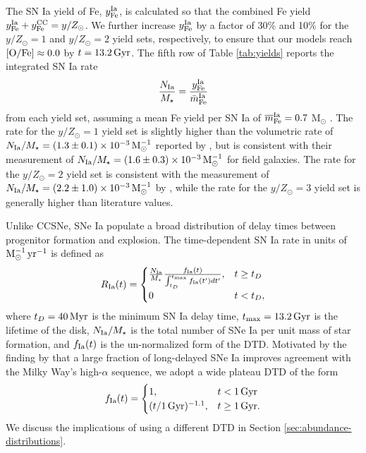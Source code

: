 \documentclass[twocolumn,twocolappendix,linenumbers]{aastex631}
\newcommand{\mathOFe}{{\rm [O/Fe]}}
\newcommand{\yZ}[1]{$y/Z_\odot=#1$}
\begin{document}
The SN Ia yield of Fe, $y_{\rm Fe}^{\rm Ia}$, is calculated so that the combined Fe yield $y_{\rm Fe}^{\rm Ia}+y_{\rm Fe}^{\rm CC}=y/Z_\odot$. We further increase $y_{\rm Fe}^{\rm Ia}$ by a factor of 30\% and 10\% for the \yZ{1} and \yZ{2} yield sets, respectively, to ensure that our models reach $\mathOFe\approx0.0$ by $t=13.2\,{\rm Gyr}$. The fifth row of Table \ref{tab:yields} reports the integrated SN Ia rate 
\begin{equation}
    \frac{N_{\rm Ia}}{M_\star} = \frac{y_{\rm Fe}^{\rm Ia}}{\bar m_{\rm Fe}^{\rm Ia}}
    \label{eq:snia-rate}
\end{equation}
from each yield set, assuming a mean Fe yield per SN Ia of $\overline m_{\rm Fe}^{\rm Ia}=0.7$ M$_\odot$ \citep{mazzali_common_2007,howell_effect_2009}. The rate for the \yZ{1} yield set is slightly higher than the volumetric rate of $N_{\rm Ia}/M_\star=(1.3\pm0.1)\times10^{-3}\,{\rm M}_\odot^{-1}$ reported by \citet{maoz_star_2017}, but is consistent with their measurement of $N_{\rm Ia}/M_\star=(1.6\pm0.3)\times10^{-3}\,{\rm M}_\odot^{-1}$ for field galaxies. The rate for the \yZ{2} yield set is consistent with the measurement of $N_{\rm Ia}/M_\star=(2.2\pm1.0)\times10^{-3}\,{\rm M}_\odot^{-1}$ by \citet{maoz_type-ia_2012}, while the rate for the \yZ{3} yield set is generally higher than literature values.

Unlike CCSNe, SNe Ia populate a broad distribution of delay times between progenitor formation and explosion. The time-dependent SN Ia rate in units of ${\rm M}_\odot^{-1}\,{\rm yr}^{-1}$ is defined as
\begin{equation}
    R_{\rm Ia}(t) = 
    \begin{cases}
        \frac{N_{\rm Ia}}{M_\star}
        \frac{f_{\rm Ia}(t)}{\int_{t_D}^{t_{\rm max}} f_{\rm Ia}(t') dt'}, & t \ge t_D \\
        0 & t < t_D,
    \end{cases}
    \label{eq:dtd-function}
\end{equation}
where $t_D=40\,{\rm Myr}$ is the minimum SN Ia delay time, $t_{\rm max}=13.2\,{\rm Gyr}$ is the lifetime of the disk, $N_{\rm Ia}/M_\star$ is the total number of SNe Ia per unit mass of star formation, and $f_{\rm Ia}(t)$ is the un-normalized form of the DTD. Motivated by the finding by \citet{dubay_galactic_2024} that a large fraction of long-delayed SNe Ia improves agreement with the Milky Way's high-$\alpha$ sequence, we adopt a wide plateau DTD of the form
\begin{equation}
    \label{eq:plateau-dtd}
    f_{\rm Ia}(t) =
    \begin{cases}
        1, & t < 1\,{\rm Gyr} \\
        (t/1\,{\rm Gyr})^{-1.1}, & t \ge 1\,{\rm Gyr}.
    \end{cases}
\end{equation}
We discuss the implications of using a different DTD in Section \ref{sec:abundance-distributions}.
\end{document}
